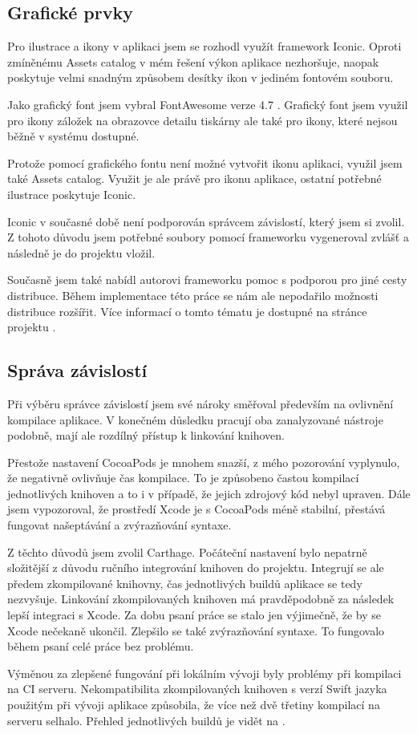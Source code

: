 

\subsection{Grafické prvky}

Pro ilustrace a ikony v aplikaci jsem se rozhodl využít framework Iconic.
Oproti zmíněnému Assets catalog v mém řešení výkon aplikace nezhoršuje, naopak poskytuje velmi snadným způsobem desítky ikon v jediném fontovém souboru.

Jako grafický font jsem vybral FontAwesome verze 4.7 \cite{fontawesome-web}.
Grafický font jsem využil pro ikony záložek na obrazovce detailu tiskárny ale také pro ikony, které nejsou běžně v systému dostupné.

Protože pomocí grafického fontu není možné vytvořit ikonu aplikaci, využil jsem také Assets catalog.
Využit je ale právě pro ikonu aplikace, ostatní potřebné ilustrace poskytuje Iconic.

Iconic v současné době není podporován správcem závislostí, který jsem si zvolil.
Z tohoto důvodu jsem potřebné soubory pomocí frameworku vygeneroval zvlášť a následně je do projektu vložil.

Současně jsem také nabídl autorovi frameworku pomoc s podporou pro jiné cesty distribuce.
Během implementace této práce se nám ale nepodařilo možnosti distribuce rozšířit.
Více informací o tomto tématu je dostupné na stránce projektu \cite{github-iconic-brew}.

\subsection{Správa závislostí}

Při výběru správce závislostí jsem své nároky směřoval především na ovlivnění kompilace aplikace.
V konečném důsledku pracují oba zanalyzované nástroje podobně, mají ale rozdílný přístup k linkování knihoven.

Přestože nastavení CocoaPods je mnohem snazší, z mého pozorování vyplynulo, že negativně ovlivňuje čas kompilace.
To je způsobeno častou kompilací jednotlivých knihoven a to i v případě, že jejich zdrojový kód nebyl upraven.
Dále jsem vypozoroval, že prostředí Xcode je s CocoaPods méně stabilní, přestává fungovat našeptávání a zvýrazňování syntaxe.

Z těchto důvodů jsem zvolil Carthage.
Počáteční nastavení bylo nepatrně složitější z důvodu ručního integrování knihoven do projektu.
Integrují se ale předem zkompilované knihovny, čas jednotlivých buildů aplikace se tedy nezvyšuje.
Linkování zkompilovaných knihoven má pravděpodobně za následek lepší integraci s Xcode.
Za dobu psaní práce se stalo jen výjimečně, že by se Xcode nečekaně ukončil.
Zlepšilo se také zvýrazňování syntaxe.
To fungovalo během psaní celé práce bez problému.

Výměnou za zlepšené fungování při lokálním vývoji byly problémy při kompilaci na CI serveru.
Nekompatibilita zkompilovaných knihoven s verzí Swift jazyka použitým při vývoji aplikace způsobila, že více než dvě třetiny kompilací na serveru selhalo.
Přehled jednotlivých buildů je vidět na \cite{travis-octophone-builds}.
